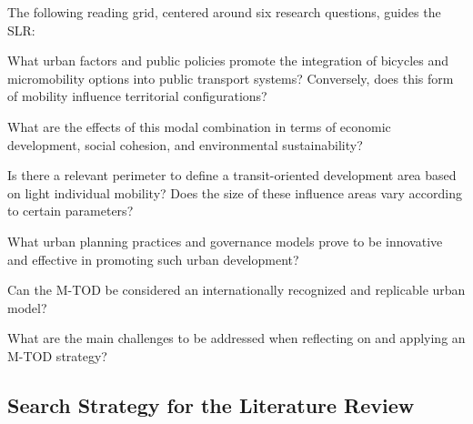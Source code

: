 \begin{refsegment}
The following reading grid, centered around six research questions, guides the \acrshort{SLR}:
    \begin{customitemize}
        \item What urban factors and public policies promote the integration of bicycles and micromobility options into public transport systems? Conversely, does this form of mobility influence territorial configurations?
        \item What are the effects of this modal combination in terms of economic development, social cohesion, and environmental sustainability?
        \item Is there a relevant perimeter to define a transit-oriented development area based on light individual mobility? Does the size of these influence areas vary according to certain parameters?
        \item What urban planning practices and governance models prove to be innovative and effective in promoting such urban development?
        \item Can the \acrshort{M-TOD} be considered an internationally recognized and replicable urban model?
        \item What are the main challenges to be addressed when reflecting on and applying an \acrshort{M-TOD} strategy?
    \end{customitemize}%

\subsection{Search Strategy for the Literature Review
    \label{chap2:strategie-recherche-documentaire}
    }


\end{refsegment}
